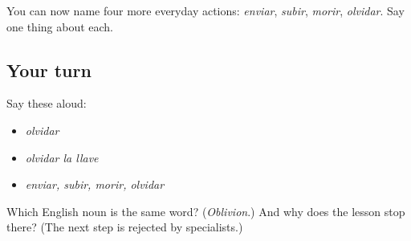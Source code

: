 \begin{grammarlens}[title={What you've built}]
You can now name four more everyday actions: \emph{enviar}, \emph{subir}, \emph{morir}, \emph{olvidar}. Say one thing about each.
\end{grammarlens}

\subsection*{Your turn}
Say these aloud:

\begin{itemize}
\raggedright
  \item \emph{olvidar}
  \item \emph{olvidar la llave}
  \item \emph{enviar, subir, morir, olvidar}
\end{itemize}

\begin{tcolorbox}[breakable,colback=teal!4,colframe=teal!35!black,title={Before you move on}]
Which English noun is the same word? (\emph{Oblivion}.) And why does the lesson stop there? (The next step is rejected by specialists.)
\end{tcolorbox}
